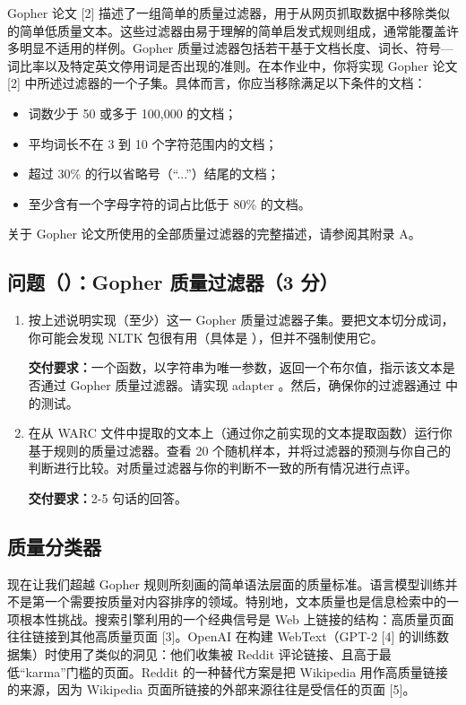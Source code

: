 Gopher 论文 [2] 描述了一组简单的质量过滤器，用于从网页抓取数据中移除类似的简单低质量文本。这些过滤器由易于理解的简单启发式规则组成，通常能覆盖许多明显不适用的样例。Gopher 质量过滤器包括若干基于文档长度、词长、符号—词比率以及特定英文停用词是否出现的准则。在本作业中，你将实现 Gopher 论文 [2] 中所述过滤器的一个子集。具体而言，你应当移除满足以下条件的文档：
\begin{itemize}
  \item 词数少于 50 或多于 100{,}000 的文档；
  \item 平均词长不在 3 到 10 个字符范围内的文档；
  \item 超过 30\% 的行以省略号（“...”）结尾的文档；
  \item 至少含有一个字母字符的词占比低于 80\% 的文档。
\end{itemize}

关于 Gopher 论文所使用的全部质量过滤器的完整描述，请参阅其附录 A。

\subsection*{问题（）：Gopher 质量过滤器（3 分）}

\begin{enumerate}[label=(\alph*)]
  \item 按上述说明实现（至少）这一 Gopher 质量过滤器子集。要把文本切分成词，你可能会发现 NLTK 包很有用（具体是 ），但并不强制使用它。

  \textbf{交付要求：}一个函数，以字符串为唯一参数，返回一个布尔值，指示该文本是否通过 Gopher 质量过滤器。请实现 adapter 。然后，确保你的过滤器通过  中的测试。

  \item 在从 WARC 文件中提取的文本上（通过你之前实现的文本提取函数）运行你基于规则的质量过滤器。查看 20 个随机样本，并将过滤器的预测与你自己的判断进行比较。对质量过滤器与你的判断不一致的所有情况进行点评。

  \textbf{交付要求：}2-5 句话的回答。
\end{enumerate}

\subsection{质量分类器}

现在让我们超越 Gopher 规则所刻画的简单语法层面的质量标准。语言模型训练并不是第一个需要按质量对内容排序的领域。特别地，文本质量也是信息检索中的一项根本性挑战。搜索引擎利用的一个经典信号是 Web 上链接的结构：高质量页面往往链接到其他高质量页面 [3]。OpenAI 在构建 WebText（GPT-2 [4] 的训练数据集）时使用了类似的洞见：他们收集被 Reddit 评论链接、且高于最低“karma”门槛的页面。Reddit 的一种替代方案是把 Wikipedia 用作高质量链接的来源，因为 Wikipedia 页面所链接的外部来源往往是受信任的页面 [5]。

